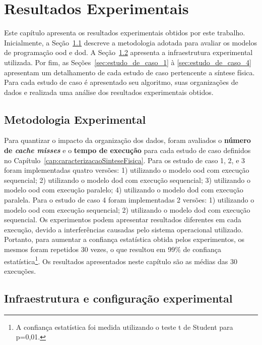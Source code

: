 \chapter{Resultados Experimentais}
\label{cap:resultados}

Este capítulo apresenta os resultados experimentais obtidos por este trabalho. 
Inicialmente, a Seção~\ref{sec:metodologia_experimental} descreve a metodologia adotada para avaliar os modelos de programação \ac{ood} e \ac{dod}.
A Seção~\ref{sec:infraestrutura_experimental} apresenta a infraestrutura experimental utilizada.
Por fim, as Seções~\ref{sec:estudo_de_caso_1} à \ref{sec:estudo_de_caso_4} apresentam um detalhamento de cada estudo de caso pertencente a síntese física.
Para cada estudo de caso é apresentado seu algoritmo, suas organizações de dados e realizada uma análise dos resultados experimentais obtidos.


\section{Metodologia Experimental}
\label{sec:metodologia_experimental}

Para quantizar o impacto da organização dos dados, foram avaliados o \textbf{número de  \textit{cache misses}} e o \textbf{tempo de execução} para cada estudo de caso definidos no Capítulo~\ref{cap:caracterizacaoSinteseFisica}.
Para os estudo de caso 1, 2, e 3 foram implementadas quatro versões: 1) utilizando o modelo \ac{ood} com execução sequencial; 2) utilizando o modelo \ac{dod} com execução sequencial; 3) utilizando o modelo \ac{ood} com execução paralelo; 4) utilizando o modelo \ac{dod} com execução paralela.
Para o estudo de caso 4 foram implementadas 2 versões: 1) utilizando o modelo \ac{ood} com execução sequencial; 2) utilizando o modelo \ac{dod} com execução sequencial.
Os experimentos podem apresentar resultados diferentes em cada execução, devido a interferências causadas pelo sistema operacional utilizado.
Portanto, para aumentar a confiança estatística obtida pelos experimentos, os mesmos foram repetidos 30 vezes, o que resultou em 99\% de confiança estatística\footnote{A confiança estatística foi medida utilizando o teste t de Student para p=0,01.}. Os resultados apresentados neste capítulo são as médias das 30 execuções.


\section{Infraestrutura e configuração experimental}
\label{sec:infraestrutura_experimental}

